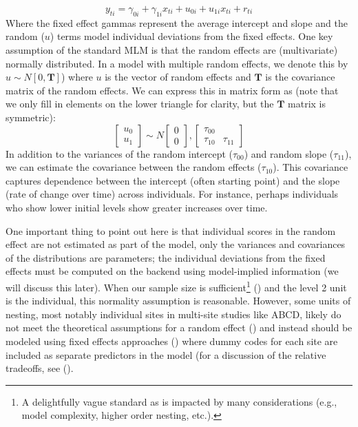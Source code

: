 \documentclass[11pt]{article}
\begin{document}
%
\begin{equation} \label{eq:3}
y_{ti} = \gamma_{0i} + \gamma_{1i}x_{ti} + u_{0i} + u_{1i}x_{ti} + r_{ti}
\end{equation}
%
Where the fixed effect gammas represent the average intercept and slope and the random ($u$) terms model individual deviations from the fixed effects. One key assumption of the standard MLM is that the random effects are (multivariate) normally distributed. In a model with multiple random effects, we denote this by $u \sim \mathit{N}[0, \mathbf{T}]$) where $u$ is the vector of random effects and $\mathbf{T}$ is the covariance matrix of the random effects. We can express this in matrix form as (note that we only fill in elements on the lower triangle for clarity, but the $\mathbf{T}$ matrix is symmetric):
%
\begin{equation} \label{eq:4}
\left[ \begin{array}{c} u_{0} \\ u_{1} \end{array} \right]  \sim \mathit{N}  \left[ \begin{array}{c} 0 \\ 0 \end{array} \right] , \left[ \begin{array}{cc} \tau_{00} & \\ \tau_{10} & \tau_{11} \end{array} \right] 
\end{equation}
%
In addition to the variances of the random intercept ($\tau_{00}$) and random slope ($\tau_{11}$), we can estimate the covariance between the random effects ($\tau_{10}$). This covariance captures dependence between the intercept (often starting point) and the slope (rate of change over time) across individuals. For instance, perhaps individuals who show lower initial levels show greater increases over time.

One important thing to point out here is that individual scores in the random effect are not estimated as part of the model, only the variances and covariances of the distributions are parameters; the individual deviations from the fixed effects must be computed on the backend using model-implied information (we will discuss this later). When our sample size is sufficient\footnote{A delightfully vague standard as  is impacted by many considerations (e.g., model complexity, higher order nesting, etc.).} (\cite{mcneish_small_2017,mcneish_modeling_2016}) and the level 2 unit is the individual, this normality assumption is reasonable. However, some units of nesting, most notably individual sites in multi-site studies like ABCD, likely do not meet the theoretical assumptions for a random effect (\cite{mcneish_unnecessary_2017}) and instead should be modeled using fixed effects approaches (\cite{mcneish_fixed_2019}) where dummy codes for each site are included as separate predictors in the model (for a discussion of the relative tradeoffs, see (\cite{feaster_modeling_2011}).
\end{document}
